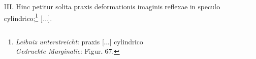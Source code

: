 \pend \pstart [p.~88] III. Hinc petitur solita praxis deformationis imaginis reflexae in speculo cylindrico\protect{};\footnote{\textit{Leibniz unterstreicht}: praxis [...] cylindrico\\\textit{Gedruckte Marginalie}: Figur. 67.} [...].